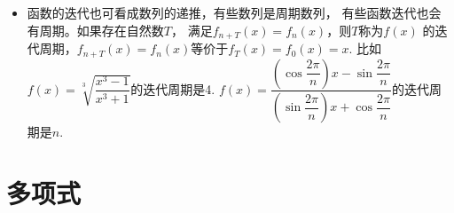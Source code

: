 \begin{itemize}[leftmargin=\inteval{\myitemleftmargin}pt,itemsep=
   \inteval{\myitemitempsep}pt,topsep=\inteval{\myitemtopsep}pt]
表中最后3个函数只需看成三角函数的二倍角公式，即$ 2\sin \theta\cos \theta $，
$ 2\cos^2 \theta-1 $，$ \dfrac{2\tan \theta}{1-\tan^2 \theta} $. 
表中的结果用数学归纳法是容易证明的。

\item 函数的迭代也可看成数列的递推，有些数列是周期数列，
有些函数迭代也会有周期。如果存在自然数$ T $，
满足$ f_{n+T}(x)=f_n(x) $，则$ T $称为$ f(x) $
的迭代周期，$ f_{n+T}(x)=f_n(x) $等价于$ f_T(x)=f_0(x)=x $. 
比如$ f(x)=\sqrt[3]{\dfrac{x^3-1}{x^3+1}} $的迭代周期是4.
$ f(x)=\dfrac{(\cos \dfrac{2\pi}{n})x-\sin \dfrac{2\pi}{n}}
{(\sin\dfrac{2\pi}{n})x+\cos \dfrac{2\pi}{n}} $的迭代周期是$ n $. 


\end{itemize}

\section{多项式}
